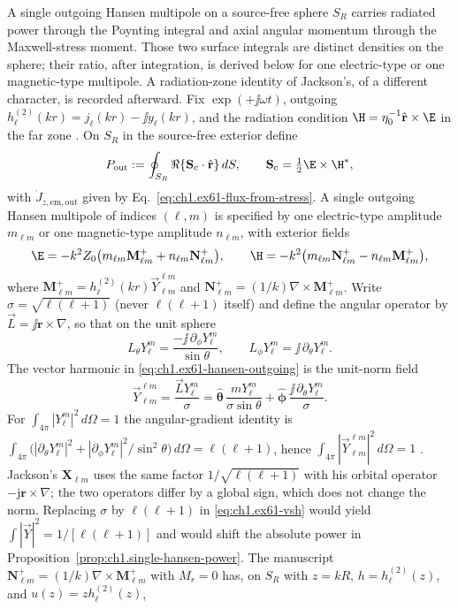 A single outgoing Hansen multipole on a source-free sphere $S_R$ carries radiated power through the Poynting integral and axial angular momentum through the Maxwell-stress moment. Those two surface integrals are distinct densities on the sphere; their ratio, after integration, is derived below for one electric-type or one magnetic-type multipole. A radiation-zone identity of Jackson's, of a different character, is recorded afterward. Fix $\exp(+\jj\omega t)$, outgoing $h_\ell^{(2)}(kr)=j_\ell(kr)-\jj y_\ell(kr)$, and the radiation condition $\H=\eta_0^{-1}\hat{\mathbf{r}}\times\E$ in the far zone \cite{stratton1941}. On $S_R$ in the source-free exterior define
\begin{equation}
\label{eq:ch1.ex61-power-def}
P_{\mathrm{out}}:=\oint_{S_R}\Re\{\mathbf{S}_\mathrm{c}\cdot\hat{\mathbf{r}}\}\,dS,\qquad
\mathbf{S}_\mathrm{c}=\tfrac12\E\times\H^*,
\end{equation}
with $\dot J_{z,\mathrm{em,out}}$ given by Eq.~\eqref{eq:ch1.ex61-flux-from-stress}. A single outgoing Hansen multipole of indices $(\ell,m)$ is specified by one electric-type amplitude $m_{\ell m}$ or one magnetic-type amplitude $n_{\ell m}$, with exterior fields
\begin{equation}
\label{eq:ch1.ex61-hansen-outgoing}
\E=-k^2 Z_0\bigl(m_{\ell m}\mathbf M_{\ell m}^+ + n_{\ell m}\mathbf N_{\ell m}^+\bigr),\qquad
\H=-k^2\bigl(m_{\ell m}\mathbf N_{\ell m}^+ - n_{\ell m}\mathbf M_{\ell m}^+\bigr),
\end{equation}
where $\mathbf M_{\ell m}^+=h_\ell^{(2)}(kr)\vec Y_{\ell m}^{\ell m}$ and $\mathbf N_{\ell m}^+=(1/k)\nabla\times\mathbf M_{\ell m}^+$. Write $\sigma=\sqrt{\ell(\ell+1)}$ (never $\ell(\ell+1)$ itself) and define the angular operator by $\vec L=\jj\mathbf r\times\nabla$, so that on the unit sphere
\[
L_\theta Y_\ell^m=\frac{-\jj\,\partial_\phi Y_\ell^m}{\sin\theta},\qquad
L_\phi Y_\ell^m=\jj\,\partial_\theta Y_\ell^m.
\]
The vector harmonic in \eqref{eq:ch1.ex61-hansen-outgoing} is the unit-norm field
\begin{equation}
\label{eq:ch1.ex61-vsh}
\vec Y_{\ell m}^{\ell m}=\frac{\vec L Y_\ell^m}{\sigma}
=\hat{\boldsymbol{\theta}}\,\frac{m Y_\ell^m}{\sigma\sin\theta}
+\hat{\boldsymbol{\phi}}\,\frac{\jj\,\partial_\theta Y_\ell^m}{\sigma}.
\end{equation}
For $\int_{4\pi}|Y_\ell^m|^2\,d\Omega=1$ the angular-gradient identity is $\int_{4\pi}\bigl(|\partial_\theta Y_\ell^m|^2+|\partial_\phi Y_\ell^m|^2/\sin^2\theta\bigr)\,d\Omega=\ell(\ell+1)$, hence $\int_{4\pi}|\vec Y_{\ell m}^{\ell m}|^2\,d\Omega=1$ \cite{jackson1999}. Jackson's $\mathbf X_{\ell m}$ \cite[Eqs.~(9.119)--(9.120)]{jackson1999} uses the same factor $1/\sqrt{\ell(\ell+1)}$ with his orbital operator $-\mathrm{j}\mathbf r\times\nabla$; the two operators differ by a global sign, which does not change the norm. Replacing $\sigma$ by $\ell(\ell+1)$ in \eqref{eq:ch1.ex61-vsh} would yield $\int|\vec Y|^2=1/[\ell(\ell+1)]$ and would shift the absolute power in Proposition~\ref{prop:ch1.single-hansen-power}. The manuscript $\mathbf N_{\ell m}^+=(1/k)\nabla\times\mathbf M_{\ell m}^+$ with $M_r=0$ has, on $S_R$ with $z=kR$, $h=h_\ell^{(2)}(z)$, and $u(z)=zh_\ell^{(2)}(z)$,
